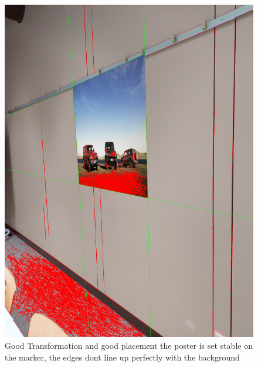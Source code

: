 \documentclass[a4paper,twocolumn]{article}
\begin{document}
    \begin{figure}[h!]
    \centering
    \includegraphics[width=0.9\columnwidth]{img/20221115_113424.jpg} %
    \caption{Good Transformation and good placement the poster is set stable on the marker, the edges dont line up perfectly with the background}
    \label{fig:20221115_113424.jpg}
    \end{figure}
    
\end{document}
